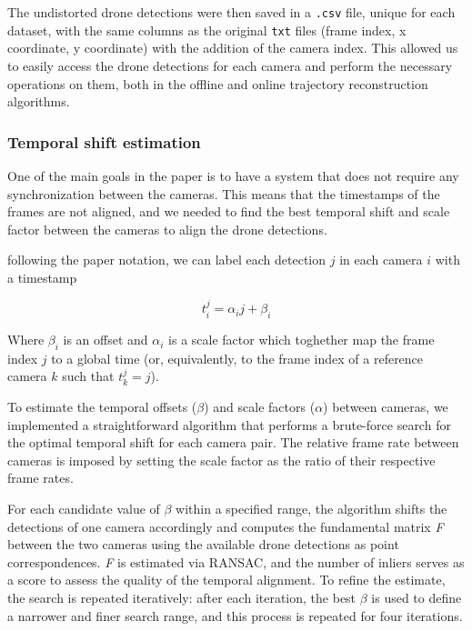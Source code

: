 \documentclass[11pt]{article}
\begin{document}
The undistorted drone detections were then saved in a \texttt{.csv} file, unique for each dataset, with the same columns as the original \texttt{txt} files (frame index, x coordinate, y coordinate) with the addition of the camera index. This allowed us to easily access the drone detections for each camera and perform the necessary operations on them, both in the offline and online trajectory reconstruction algorithms.

\subsubsection{Temporal shift estimation}

One of the main goals in the paper is to have a system that does not require any synchronization between the cameras. This means that the timestamps of the frames are not aligned, and we needed to find the best temporal shift and scale factor between the cameras to align the drone detections.

following the paper notation, we can label each detection $j$ in each camera $i$ with a timestamp

\begin{equation}
    t_i^j = \alpha_i j + \beta_i
\end{equation}

Where $\beta_i$ is an offset and $\alpha_i$ is a scale factor which toghether map the frame index $j$ to a global time (or, equivalently, to the frame index of a reference camera $k$ such that $t_k^j = j$).

To estimate the temporal offsets ($\beta$) and scale factors ($\alpha$) between cameras, we implemented a straightforward algorithm that performs a brute-force search for the optimal temporal shift for each camera pair. The relative frame rate between cameras is imposed by setting the scale factor as the ratio of their respective frame rates.

For each candidate value of $\beta$ within a specified range, the algorithm shifts the detections of one camera accordingly and computes the fundamental matrix \textit{F} between the two cameras using the available drone detections as point correspondences. \textit{F} is estimated via RANSAC, and the number of inliers serves as a score to assess the quality of the temporal alignment. To refine the estimate, the search is repeated iteratively: after each iteration, the best $\beta$ is used to define a narrower and finer search range, and this process is repeated for four iterations.
\end{document}
